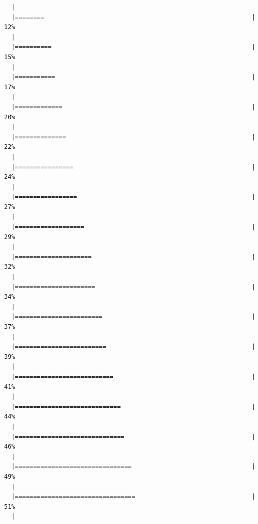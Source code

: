 \documentclass[]{article}
\begin{document}
\begin{verbatim}
  |                                                                       
  |========                                                         |  12%
  |                                                                       
  |==========                                                       |  15%
  |                                                                       
  |===========                                                      |  17%
  |                                                                       
  |=============                                                    |  20%
  |                                                                       
  |==============                                                   |  22%
  |                                                                       
  |================                                                 |  24%
  |                                                                       
  |=================                                                |  27%
  |                                                                       
  |===================                                              |  29%
  |                                                                       
  |=====================                                            |  32%
  |                                                                       
  |======================                                           |  34%
  |                                                                       
  |========================                                         |  37%
  |                                                                       
  |=========================                                        |  39%
  |                                                                       
  |===========================                                      |  41%
  |                                                                       
  |=============================                                    |  44%
  |                                                                       
  |==============================                                   |  46%
  |                                                                       
  |================================                                 |  49%
  |                                                                       
  |=================================                                |  51%
  |                                                                       

\end{verbatim}
\end{document}
